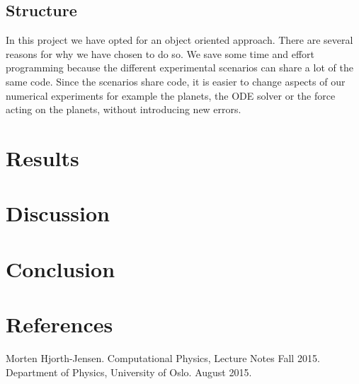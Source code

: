 \documentclass[norsk,a4paper,12pt]{article}
\begin{document}
{\subsection{Structure}
In this project we have opted for an object oriented approach. There are several reasons for why we have chosen to do so. We save some time and effort programming because the different experimental scenarios can share a lot of the same code. Since the scenarios share code, it is easier to change aspects of our numerical experiments for example the planets, the ODE solver or the force acting on the planets, without introducing new errors. 
\section{Results}
\section{Discussion}
\section{Conclusion}
\section{References}
\begingroup
\renewcommand{\section}[2]{}
\begin{thebibliography}{}
  Morten Hjorth-Jensen.
  Computational Physics, Lecture Notes Fall 2015.
  Department of Physics, University of Oslo.
  August 2015.
\end{thebibliography}
\endgroup
\end{document}
